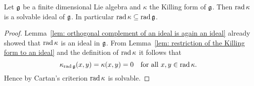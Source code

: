 \begin{cor}\label{cor: rad kappa is a solvable ideal}
 Let $\mathfrak{g}$ be a finite dimensional Lie algebra and $\kappa$ the Killing form of $\mathfrak{g}$. Then $\operatorname{rad} \kappa$ is a solvable ideal of $\mathfrak{g}$. In particular $\operatorname{rad} \kappa \subseteq \operatorname{rad} \mathfrak{g}$.
\end{cor}
\begin{proof}
 Lemma~\ref{lem: orthogonal complement of an ideal is again an ideal} already showed that $\operatorname{rad} \kappa$ is an ideal in $\mathfrak{g}$. From Lemma~\ref{lem: restriction of the Killing form to an ideal} and the definition of $\operatorname{rad} \kappa$ it follows that 
 \[
  \kappa_{\operatorname{rad} \mathfrak{g}}(x,y) = \kappa(x,y) = 0 \quad \text{for all $x,y \in \operatorname{rad} \kappa$}.
 \]
 Hence by Cartan’s criterion $\operatorname{rad} \kappa$ is solvable.
\end{proof}
















